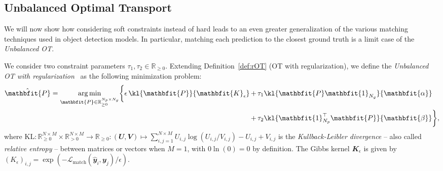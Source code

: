 \subsection{Unbalanced Optimal Transport}
We will now show how considering soft constraints instead of hard leads to an even greater generalization of the various matching techniques used in object detection models. In particular, matching each prediction to the closest ground truth is a limit case of the \emph{Unbalanced OT}.
\begin{definition}[Unbalanced OT]
\label{def:ruOT}
We consider two constraint parameters $\tau_1, \tau_2 \in \mathbb{R}_{\geq 0}$. Extending Definition~\ref{def:rOT} (OT with regularization), we define the \emph{Unbalanced OT with regularization}~\cite{chizat2018scaling} as the following minimization problem:
\begin{equation}
\begin{aligned}
    \hat{\mathbfit{P}} = \underset{\mathbfit{P} \in \mathbb{R}_{\geq 0}^{N_p\times N_g}}{\mathrm{arg\, min}}\biggl\{\epsilon\,\kl{\mathbfit{P}}{\mathbfit{K}_{\epsilon}}\, + & \, \tau_1\kl{\mathbfit{P}\mathbfit{1}_{N_g}}{\mathbfit{\alpha}} \\
    + & \, \tau_2\kl{\mathbfit{1}_{N_p}^\top \mathbfit{P}}{ \mathbfit{\beta}}\biggr\},
\end{aligned}%
\end{equation}
where $\mathrm{KL}: \mathbb{R}^{N\times M}_{\geq 0} \times \mathbb{R}^{N\times M}_{> 0} \rightarrow \mathbb{R}_{\geq 0}^{\phantom{N}} : (\mathbfit{U},\mathbfit{V}) \mapsto \sum_{i,j=1}^{N \times M} U_{i,j} \log(U_{i,j} / V_{i,j}) - U_{i,j} + V_{i,j}$ is the \emph{Kullback-Leibler divergence} -- also called \emph{relative entropy} -- between matrices or vectors when $M=1$, with $0 \ln (0) = 0$ by definition. The Gibbs kernel $\mathbfit{K}_{\epsilon}$ is given by $\left(K_{\epsilon}\right)_{i,j} = \exp\left(- \mathcal{L}_{\text{match}}\left(\hat{\mathbfit{y}}_i, \mathbfit{y}_j \right)/ \epsilon \right)$.
\end{definition}

